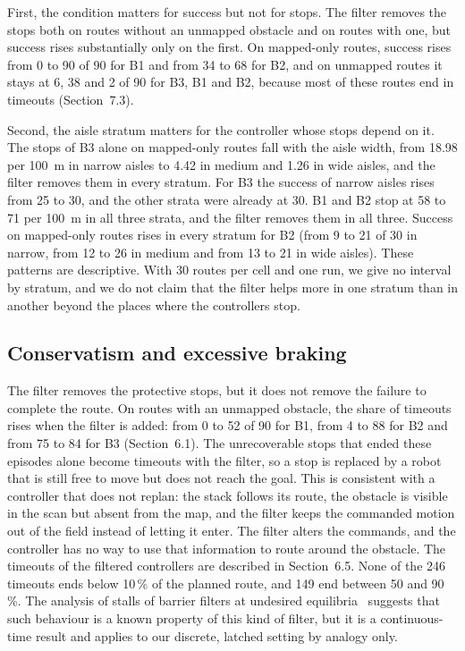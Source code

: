 First, the condition matters for success but not for stops. The filter removes the stops both on routes without an unmapped obstacle and on routes with one, but success rises substantially only on the first. On mapped-only routes, success rises from 0 to 90 of 90 for B1 and from 34 to 68 for B2, and on unmapped routes it stays at 6, 38 and 2 of 90 for B3, B1 and B2, because most of these routes end in timeouts (Section~7.3).

Second, the aisle stratum matters for the controller whose stops depend on it. The stops of B3 alone on mapped-only routes fall with the aisle width, from 18.98 per 100~m in narrow aisles to 4.42 in medium and 1.26 in wide aisles, and the filter removes them in every stratum. For B3 the success of narrow aisles rises from 25 to 30, and the other strata were already at 30. B1 and B2 stop at 58 to 71 per 100~m in all three strata, and the filter removes them in all three. Success on mapped-only routes rises in every stratum for B2 (from 9 to 21 of 30 in narrow, from 12 to 26 in medium and from 13 to 21 in wide aisles). These patterns are descriptive. With 30 routes per cell and one run, we give no interval by stratum, and we do not claim that the filter helps more in one stratum than in another beyond the places where the controllers stop.

\subsection{Conservatism and excessive braking}
The filter removes the protective stops, but it does not remove the failure to complete the route. On routes with an unmapped obstacle, the share of timeouts rises when the filter is added: from 0 to 52 of 90 for B1, from 4 to 88 for B2 and from 75 to 84 for B3 (Section~6.1). The unrecoverable stops that ended these episodes alone become timeouts with the filter, so a stop is replaced by a robot that is still free to move but does not reach the goal. This is consistent with a controller that does not replan: the stack follows its route, the obstacle is visible in the scan but absent from the map, and the filter keeps the commanded motion out of the field instead of letting it enter. The filter alters the commands, and the controller has no way to use that information to route around the obstacle. The timeouts of the filtered controllers are described in Section~6.5. None of the 246 timeouts ends below 10\,\% of the planned route, and 149 end between 50 and 90\,\%. The analysis of stalls of barrier filters at undesired equilibria~\cite{mestres2026} suggests that such behaviour is a known property of this kind of filter, but it is a continuous-time result and applies to our discrete, latched setting by analogy only.

